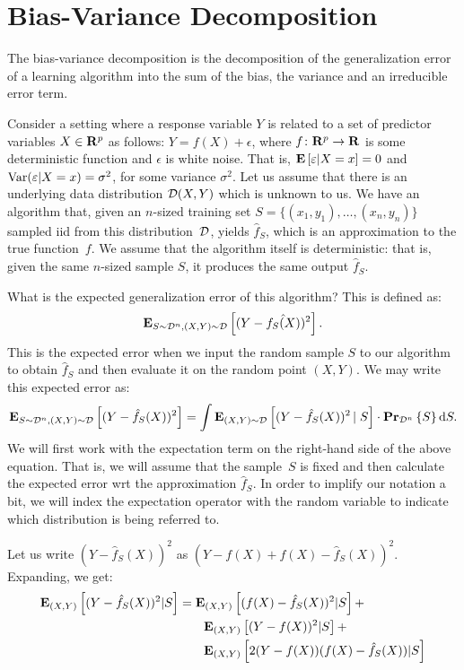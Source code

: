 \chapter{Bias-Variance Decomposition}

The bias-variance decomposition is the decomposition of the generalization
error of a learning algorithm into the sum of the bias, the variance and an irreducible
error term.

Consider a setting where a response variable $Y$ is related to a set of
predictor variables $X \in \mathbf{R}^p$ as follows: $Y = f(X) + \epsilon$, where
$f \colon \mathbf{R}^p \rightarrow \mathbf{R}$ is some deterministic function and
$\epsilon$ is white noise. That is, $\mathbf{E} \left [ \varepsilon \vert X = x \right ] = 0$ and
$\text{Var} (\varepsilon \vert X = x) = \sigma^2$, for some variance $\sigma^2$. Let us
assume that there is an underlying data distribution $\mathcal{D} (X, Y)$ which is
unknown to us. We have an algorithm that, given an $n$-sized training set
$S = \{ (x_1, y_1), \ldots, (x_n, y_n) \}$ sampled iid from this distribution~$\mathcal{D}$,
yields $\hat{f}_S$, which is an approximation to the true function~$f$.
We assume that the algorithm itself is deterministic: that is, given the same
$n$-sized sample $S$, it produces the same output $\hat{f}_S$.

What is the expected generalization error of this algorithm? This is defined
as:
\begin{equation}
    \mathbf{E}_{S \sim \mathcal{D}^n, (X, Y) \sim \mathcal{D}} \left [ (Y - \hat{f_S(X)})^2 \right ].
\end{equation}
This is the expected error when we input the random sample $S$ to our algorithm
to obtain $\hat{f}_S$ and then evaluate it on the random point $(X, Y)$.
We may write this expected error as:
\begin{equation} \label{eqn:basic_integral}
    \mathbf{E}_{S \sim \mathcal{D}^n, (X, Y) \sim \mathcal{D}} \left [ (Y - \hat{f}_S(X))^2 \right ] =
    \int \mathbf{E}_{(X, Y) \sim \mathcal{D}} \left [ (Y - \hat{f}_S(X))^2 \left \vert \right . S \right ]
    \cdot \mathbf{Pr}_{\mathcal{D}^n} \left \{ S \right \} \text{d} S.
\end{equation}
We will first work with the expectation term on the right-hand side of the above
equation. That is, we will assume that the sample~$S$ is fixed and then calculate
the expected error wrt the approximation $\hat{f}_S$. In order to implify our
notation a bit, we will index the expectation operator with the random variable
to indicate which distribution is being referred to.

Let us write $(Y - \hat{f}_S(X))^2$ as $(Y - f(X) + f(X) - \hat{f}_S(X))^2$.
Expanding, we get:
\begin{equation}\label{eqn:break_up}
\begin{split}
    \mathbf{E}_{(X, Y)} \left [ (Y - \hat{f}_S(X))^2 \vert S \right ] & =
    \mathbf{E}_{(X, Y)} \left [ (f(X) - \hat{f}_S(X))^2 \vert S \right ] + \\
    & \quad \quad \mathbf{E}_{(X, Y)} \left [ (Y - f(X))^2 \vert S \right ] + \\
    & \quad \quad \mathbf{E}_{(X, Y)} \left [ 2 (Y - f(X)) (f(X) - \hat{f}_S(X)) \vert S \right ]
\end{split}
\end{equation}

